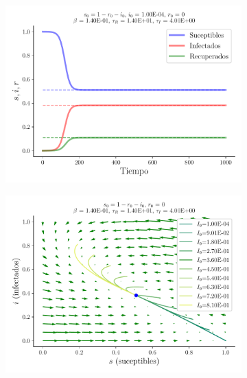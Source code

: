 \documentclass[twocolumn,aps,prl]{revtex4-1}
\begin{document}
\begin{figure}[ht!]
  \begin{subfigure}[b]{0.49\linewidth}
      \centering
      \includegraphics[width = 1.05\textwidth]{figuras/ex01-b-sir.pdf}
      \caption{}
      \label{fig:ex01-b-sir}
  \end{subfigure}\quad
  \begin{subfigure}[b]{0.49\linewidth}
      \centering
      \includegraphics[width = 1.05\textwidth]{figuras/ex01-b-vector.pdf}
      \caption{}
      \label{fig:ex01-b-vector}
  \end{subfigure}\quad


\end{figure}
\end{document}
